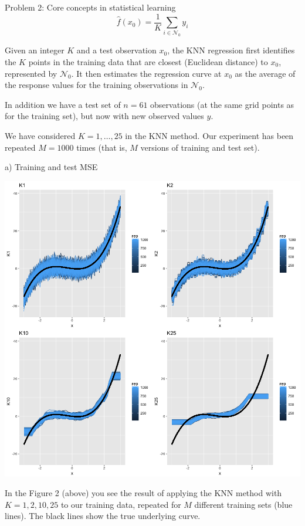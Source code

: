 \documentclass[ignorenonframetext,]{beamer}
\begin{document}
\begin{frame}
\begin{block}{Problem 2: Core concepts in statistical learning}
\[\hat{f}(x_0)=\frac{1}{K}\sum_{i\in \mathcal{N}_0} y_i\]

Given an integer \(K\) and a test observation \(x_0\), the KNN
regression first identifies the \(K\) points in the training data that
are closest (Euclidean distance) to \(x_0\), represented by
\(\mathcal{N}_0\). It then estimates the regression curve at \(x_0\) as
the average of the response values for the training observations in
\(\mathcal{N}_0\).

In addition we have a test set of \(n=61\) observations (at the same
grid points as for the training set), but now with new observed values
\(y\).

We have considered \(K=1,\ldots,25\) in the KNN method. Our experiment
has been repeated \(M=1000\) times (that is, \(M\) versions of training
and test set).

\end{block}

\begin{block}{a) Training and test MSE}

\includegraphics{Prob1f2.png}

In the Figure 2 (above) you see the result of applying the KNN method
with \(K=1,2,10,25\) to our training data, repeated for \(M\) different
training sets (blue lines). The black lines show the true underlying
curve.


\end{block}
\end{frame}
\end{document}
